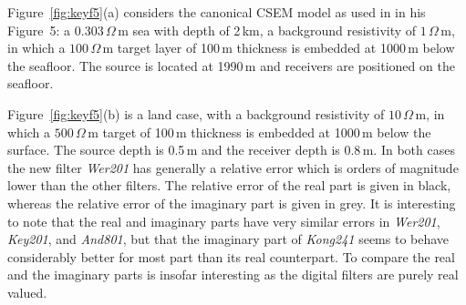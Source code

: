 \documentclass[paper,twocolumn,twoside]{geophysics}
\begin{document}
Figure~\ref{fig:keyf5}(a) considers the canonical CSEM model as used in
\cite{GEO.12.Key} in his Figure~5: a $0.303\,\Omega\,$m sea with depth of
2\,km, a background resistivity of $1\,\Omega\,$m, in which a $100\,\Omega\,$m
target layer of 100\,m thickness is embedded at 1000\,m below the seafloor.
The source is located at 1990\,m and receivers are positioned on the seafloor.
%
%

Figure~\ref{fig:keyf5}(b) is a land case, with a background resistivity of
$10\,\Omega\,$m, in which a $500\,\Omega\,$m target of 100\,m thickness is
embedded at 1000\,m below the surface. The source depth is 0.5\,m and the
receiver depth is 0.8\,m. In both cases the new filter \emph{Wer201} has
generally a relative error which is orders of magnitude lower than the other
filters. The relative error of the real part is given in black, whereas the
relative error of the imaginary part is given in grey. It is interesting to
note that the real and imaginary parts have very similar errors in
\emph{Wer201}, \emph{Key201}, and \emph{And801}, but that the imaginary part of
\emph{Kong241} seems to behave considerably better for most part than its real
counterpart. To compare the real and the imaginary parts is insofar interesting
as the digital filters are purely real valued.
\end{document}
